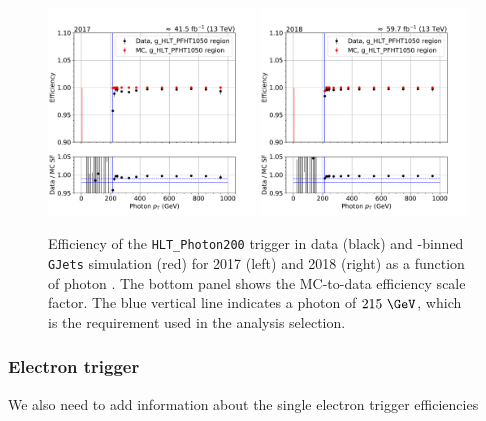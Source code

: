 \begin{figure}[hbtp]\begin{center}
    \includegraphics[width=0.49\textwidth]{fig/efficiency/trigger/photon/data_mc_comparison_g_HLT_PFHT1050_2017.pdf}
    \includegraphics[width=0.49\textwidth]{fig/efficiency/trigger/photon/data_mc_comparison_g_HLT_PFHT1050_2018.pdf}
    \caption{Efficiency of the \texttt{HLT\_Photon200} trigger in data (black) and \HT-binned \texttt{GJets} simulation (red) for 2017 (left) and 2018 (right) as a function of photon \pt. The bottom panel shows the MC-to-data efficiency scale factor. The blue vertical line indicates a photon \pt of $215~\GeV$, which is the requirement used in the analysis selection.}
    \label{fig:hlteff_photon}
 \end{center}\end{figure}

 \subsubsection{Electron trigger}
{\color{red} We also need to add information about the single electron trigger efficiencies}
